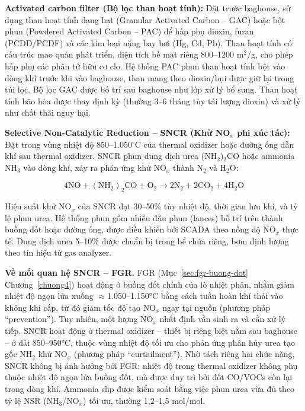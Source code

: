 \documentclass[../main.tex]{subfiles}
\begin{document}
\textbf{Activated carbon filter (Bộ lọc than hoạt tính):} Đặt trước baghouse, sử dụng than hoạt tính dạng hạt (Granular Activated Carbon -- GAC) hoặc bột phun (Powdered Activated Carbon -- PAC) để hấp phụ dioxin, furan (PCDD/PCDF) và các kim loại nặng bay hơi (Hg, Cd, Pb). Than hoạt tính có cấu trúc mao quản phát triển, diện tích bề mặt riêng 800--1200 m$^2$/g, cho phép hấp phụ các phân tử hữu cơ clo. Hệ thống PAC phun than hoạt tính bột vào dòng khí trước khi vào baghouse, than mang theo dioxin/bụi được giữ lại trong túi lọc. Bộ lọc GAC được bố trí sau baghouse như lớp xử lý bổ sung. Than hoạt tính bão hòa được thay định kỳ (thường 3--6 tháng tùy tải lượng dioxin) và xử lý như chất thải nguy hại.

\textbf{Selective Non-Catalytic Reduction -- SNCR (Khử NO$_x$ phi xúc tác):} Đặt trong vùng nhiệt độ 850--1.050$^\circ\mathrm{C}$ của thermal oxidizer hoặc đường ống dẫn khí sau thermal oxidizer. SNCR phun dung dịch urea (NH$_2$)$_2$CO hoặc ammonia NH$_3$ vào dòng khí, xảy ra phản ứng khử NO$_x$ thành N$_2$ và H$_2$O:

\begin{equation}
4\mathrm{NO} + (\mathrm{NH}_2)_2\mathrm{CO} + \mathrm{O}_2 \rightarrow 2\mathrm{N}_2 + 2\mathrm{CO}_2 + 4\mathrm{H}_2\mathrm{O}
\label{eq:sncr-urea}
\end{equation}

Hiệu suất khử NO$_x$ của SNCR đạt 30--50\% tùy nhiệt độ, thời gian lưu khí, và tỷ lệ phun urea. Hệ thống phun gồm nhiều đầu phun (lances) bố trí trên thành buồng đốt hoặc đường ống, được điều khiển bởi SCADA theo nồng độ NO$_x$ thực tế. Dung dịch urea 5--10\% được chuẩn bị trong bể chứa riêng, bơm định lượng theo tín hiệu từ gas analyzer.

\textbf{Về mối quan hệ SNCR -- FGR.} FGR (Mục~\ref{sec:fgr-buong-dot} Chương~\ref{chuong4}) hoạt động ở buồng đốt chính của lò nhiệt phân, nhằm giảm nhiệt độ ngọn lửa xuống $\approx$1.050--1.150°C bằng cách tuần hoàn khí thải vào không khí cấp, từ đó giảm tốc độ tạo NO$_x$ ngay tại nguồn (phương pháp ``prevention''). Tuy nhiên, một lượng NO$_x$ nhất định vẫn sinh ra và cần xử lý tiếp. SNCR hoạt động ở thermal oxidizer -- thiết bị riêng biệt nằm sau baghouse -- ở dải 850--950°C, thuộc vùng nhiệt độ tối ưu cho phản ứng phân hủy urea tạo gốc NH$_2$ khử NO$_x$ (phương pháp ``curtailment''). Nhờ tách riêng hai chức năng, SNCR không bị ảnh hưởng bởi FGR: nhiệt độ trong thermal oxidizer không phụ thuộc nhiệt độ ngọn lửa buồng đốt, mà được duy trì bởi đốt CO/VOCs còn lại trong dòng khí. Ammonia slip được kiểm soát bằng việc phun urea vừa đủ theo tỷ lệ NSR (NH$_3$/NO$_x$) tối ưu, thường 1,2--1,5 mol/mol.
\end{document}
